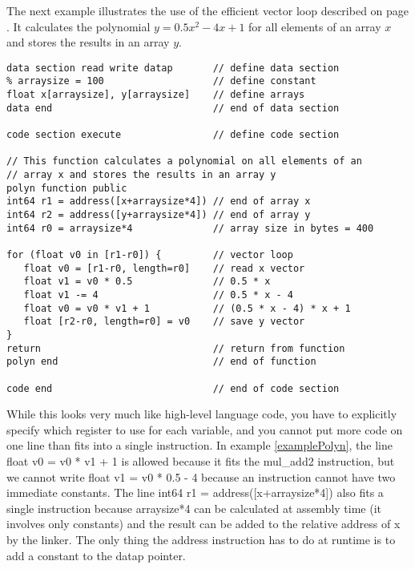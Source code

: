 \documentclass[forwardcom.tex]{subfiles}
\begin{document}
The next example illustrates the use of the efficient vector loop described on page \pageref{vectorLoops}. 
It calculates the polynomial $y = 0.5 x^2 - 4 x + 1$ for all elements of an array $x$
and stores the results in an array $y$.

\begin{example}
\label{examplePolyn}
\end{example} %
\begin{lstlisting}[frame=single]
data section read write datap       // define data section
% arraysize = 100                   // define constant
float x[arraysize], y[arraysize]    // define arrays
data end                            // end of data section

code section execute                // define code section

// This function calculates a polynomial on all elements of an
// array x and stores the results in an array y
polyn function public
int64 r1 = address([x+arraysize*4]) // end of array x
int64 r2 = address([y+arraysize*4]) // end of array y
int64 r0 = arraysize*4              // array size in bytes = 400

for (float v0 in [r1-r0]) {         // vector loop
   float v0 = [r1-r0, length=r0]    // read x vector
   float v1 = v0 * 0.5              // 0.5 * x
   float v1 -= 4                    // 0.5 * x - 4
   float v0 = v0 * v1 + 1           // (0.5 * x - 4) * x + 1
   float [r2-r0, length=r0] = v0    // save y vector
}
return                              // return from function
polyn end                           // end of function

code end                            // end of code section
\end{lstlisting}
\vspace{2mm}

While this looks very much like high-level language code, you have to explicitly specify which register to use for each variable, and you cannot put more code on one line than fits into a single instruction.
In example \ref{examplePolyn}, the line {\ttfamily float v0 = v0 * v1 + 1 } is allowed because it fits the {\ttfamily mul\_add2} instruction, but we cannot write {\ttfamily float v1 = v0 * 0.5 - 4 } because an instruction cannot have two immediate constants.
The line {\ttfamily int64 r1 = address([x+arraysize*4])} also fits a single instruction because 
{\ttfamily arraysize*4} can be calculated at assembly time (it involves only constants) and the result can be added to the relative address of {\ttfamily x} by the linker. The only thing the {\ttfamily address} instruction has to do at runtime is to add a constant to the {\ttfamily datap} pointer.
\vspace{2mm}
\end{document}
